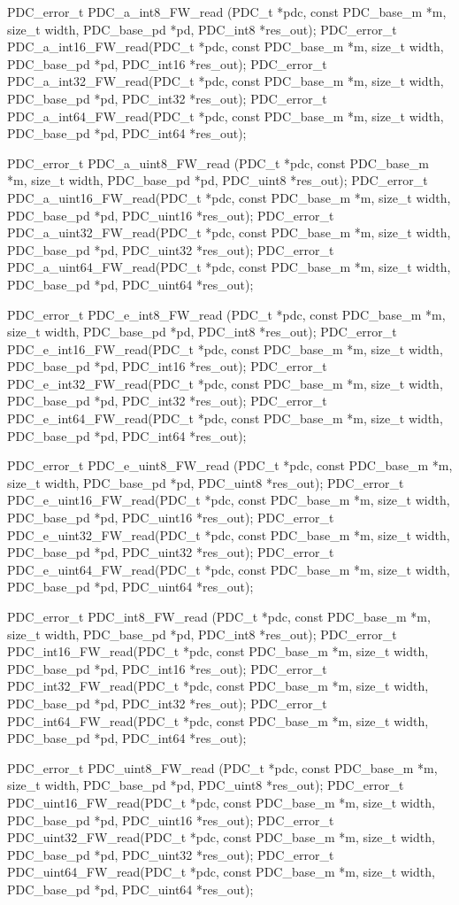 \begin{tinycodeaux}{\leftmargin=0in}
PDC_error_t PDC_a_int8_FW_read (PDC_t *pdc, const PDC_base_m *m, size_t width,
				PDC_base_pd *pd, PDC_int8 *res_out);
PDC_error_t PDC_a_int16_FW_read(PDC_t *pdc, const PDC_base_m *m, size_t width,
				PDC_base_pd *pd, PDC_int16 *res_out);
PDC_error_t PDC_a_int32_FW_read(PDC_t *pdc, const PDC_base_m *m, size_t width,
				PDC_base_pd *pd, PDC_int32 *res_out);
PDC_error_t PDC_a_int64_FW_read(PDC_t *pdc, const PDC_base_m *m, size_t width,
				PDC_base_pd *pd, PDC_int64 *res_out);

PDC_error_t PDC_a_uint8_FW_read (PDC_t *pdc, const PDC_base_m *m, size_t width,
				 PDC_base_pd *pd, PDC_uint8 *res_out);
PDC_error_t PDC_a_uint16_FW_read(PDC_t *pdc, const PDC_base_m *m, size_t width,
				 PDC_base_pd *pd, PDC_uint16 *res_out);
PDC_error_t PDC_a_uint32_FW_read(PDC_t *pdc, const PDC_base_m *m, size_t width,
				 PDC_base_pd *pd, PDC_uint32 *res_out);
PDC_error_t PDC_a_uint64_FW_read(PDC_t *pdc, const PDC_base_m *m, size_t width,
				 PDC_base_pd *pd, PDC_uint64 *res_out);

PDC_error_t PDC_e_int8_FW_read (PDC_t *pdc, const PDC_base_m *m, size_t width,
				PDC_base_pd *pd, PDC_int8 *res_out);
PDC_error_t PDC_e_int16_FW_read(PDC_t *pdc, const PDC_base_m *m, size_t width,
				PDC_base_pd *pd, PDC_int16 *res_out);
PDC_error_t PDC_e_int32_FW_read(PDC_t *pdc, const PDC_base_m *m, size_t width,
				PDC_base_pd *pd, PDC_int32 *res_out);
PDC_error_t PDC_e_int64_FW_read(PDC_t *pdc, const PDC_base_m *m, size_t width,
				PDC_base_pd *pd, PDC_int64 *res_out);

PDC_error_t PDC_e_uint8_FW_read (PDC_t *pdc, const PDC_base_m *m, size_t width,
				 PDC_base_pd *pd, PDC_uint8 *res_out);
PDC_error_t PDC_e_uint16_FW_read(PDC_t *pdc, const PDC_base_m *m, size_t width,
				 PDC_base_pd *pd, PDC_uint16 *res_out);
PDC_error_t PDC_e_uint32_FW_read(PDC_t *pdc, const PDC_base_m *m, size_t width,
				 PDC_base_pd *pd, PDC_uint32 *res_out);
PDC_error_t PDC_e_uint64_FW_read(PDC_t *pdc, const PDC_base_m *m, size_t width,
				 PDC_base_pd *pd, PDC_uint64 *res_out);

PDC_error_t PDC_int8_FW_read (PDC_t *pdc, const PDC_base_m *m, size_t width,
			      PDC_base_pd *pd, PDC_int8 *res_out);
PDC_error_t PDC_int16_FW_read(PDC_t *pdc, const PDC_base_m *m, size_t width,
			      PDC_base_pd *pd, PDC_int16 *res_out);
PDC_error_t PDC_int32_FW_read(PDC_t *pdc, const PDC_base_m *m, size_t width,
			      PDC_base_pd *pd, PDC_int32 *res_out);
PDC_error_t PDC_int64_FW_read(PDC_t *pdc, const PDC_base_m *m, size_t width,
			      PDC_base_pd *pd, PDC_int64 *res_out);

PDC_error_t PDC_uint8_FW_read (PDC_t *pdc, const PDC_base_m *m, size_t width,
			       PDC_base_pd *pd, PDC_uint8 *res_out);
PDC_error_t PDC_uint16_FW_read(PDC_t *pdc, const PDC_base_m *m, size_t width,
			       PDC_base_pd *pd, PDC_uint16 *res_out);
PDC_error_t PDC_uint32_FW_read(PDC_t *pdc, const PDC_base_m *m, size_t width,
			       PDC_base_pd *pd, PDC_uint32 *res_out);
PDC_error_t PDC_uint64_FW_read(PDC_t *pdc, const PDC_base_m *m, size_t width,
			       PDC_base_pd *pd, PDC_uint64 *res_out);
\end{tinycodeaux}

